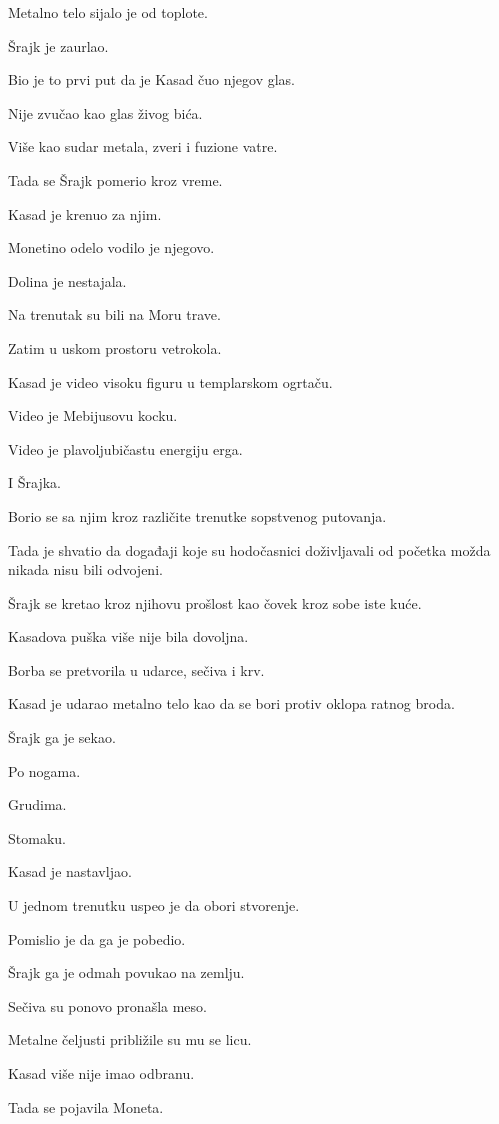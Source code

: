 Metalno telo sijalo je od toplote.

Šrajk je zaurlao.

Bio je to prvi put da je Kasad čuo njegov glas.

Nije zvučao kao glas živog bića.

Više kao sudar metala, zveri i fuzione vatre.

Tada se Šrajk pomerio kroz vreme.

Kasad je krenuo za njim.

Monetino odelo vodilo je njegovo.

Dolina je nestajala.

Na trenutak su bili na Moru trave.

Zatim u uskom prostoru vetrokola.

Kasad je video visoku figuru u templarskom ogrtaču.

Video je Mebijusovu kocku.

Video je plavoljubičastu energiju erga.

I Šrajka.

Borio se sa njim kroz različite trenutke sopstvenog putovanja.

Tada je shvatio da događaji koje su hodočasnici doživljavali od početka možda nikada nisu bili odvojeni.

Šrajk se kretao kroz njihovu prošlost kao čovek kroz sobe iste kuće.

\bigskip

Kasadova puška više nije bila dovoljna.

Borba se pretvorila u udarce, sečiva i krv.

Kasad je udarao metalno telo kao da se bori protiv oklopa ratnog broda.

Šrajk ga je sekao.

Po nogama.

Grudima.

Stomaku.

Kasad je nastavljao.

U jednom trenutku uspeo je da obori stvorenje.

Pomislio je da ga je pobedio.

Šrajk ga je odmah povukao na zemlju.

Sečiva su ponovo pronašla meso.

Metalne čeljusti približile su mu se licu.

Kasad više nije imao odbranu.

Tada se pojavila Moneta.

